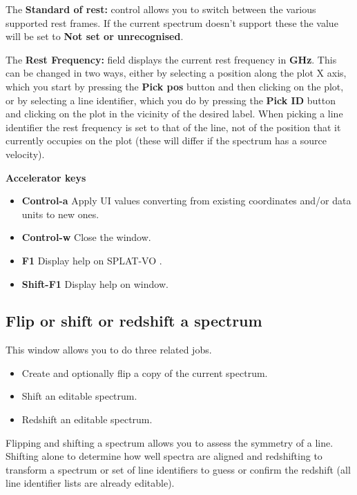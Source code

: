 \documentclass[twoside,11pt,nolof]{starlink}
\providecommand{\SPLAT}{\textsf{SPLAT-VO }}
\newcommand{\labelitem}[1]{\textbf{#1}}
\providecommand{\subheading}[1]{\textbf{\large{#1}}}
\begin{document}
The \labelitem{Standard of rest:} control allows you to switch between
the various supported rest frames. If the current spectrum doesn't support
these the value will be set to \labelitem{Not set or unrecognised}.

The \labelitem{Rest Frequency:} field displays the current rest frequency in
\labelitem{GHz}. This can be changed in two ways, either by selecting a
position along the plot X axis, which you start by pressing the
\labelitem{Pick pos} button and then clicking on the plot, or by selecting a
line identifier, which you do by pressing the \labelitem{Pick ID} button and
clicking on the plot in the vicinity of the desired label. When picking
a line identifier the rest frequency is set to that of the line, not of the
position that it currently occupies on the plot (these will differ if
the spectrum has a source velocity).

\subheading{Accelerator keys}

\begin{itemize}
\item \labelitem{Control-a} Apply UI values converting from existing
coordinates and/or data units to new ones.

\item \labelitem{Control-w} Close the window.
\item \labelitem{F1} Display help on \SPLAT.
\item \labelitem{Shift-F1} Display help on window.
\end{itemize}


\newpage
\subsection{Flip or shift or redshift a spectrum}

This window allows you to do three related jobs.
\begin{itemize}
\item Create and optionally flip a copy of the current spectrum.
\item Shift an editable spectrum.
\item Redshift an editable spectrum.
\end{itemize}

Flipping and shifting a spectrum allows you to assess the symmetry of a
line. Shifting alone to determine how well spectra are aligned and redshifting
to transform a spectrum or set of line identifiers to guess or confirm the
redshift (all line identifier lists are already editable).
\end{document}
